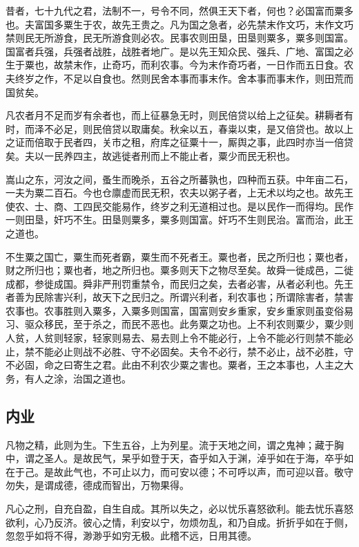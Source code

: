 \documentclass[]{article}
\begin{document}
昔者，七十九代之君，法制不一，号令不同，然俱王天下者，何也？必国富而粟多也。夫富国多粟生于农，故先王贵之。凡为国之急者，必先禁末作文巧，末作文巧禁则民无所游食，民无所游食则必农。民事农则田垦，田垦则粟多，粟多则国富。国富者兵强，兵强者战胜，战胜者地广。是以先王知众民、强兵、广地、富国之必生于粟也，故禁末作，止奇巧，而利农事。今为末作奇巧者，一日作而五日食。农夫终岁之作，不足以自食也。然则民舍本事而事末作。舍本事而事末作，则田荒而国贫矣。

凡农者月不足而岁有余者也，而上征暴急无时，则民倍贷以给上之征矣。耕耨者有时，而泽不必足，则民倍贷以取庸矣。秋籴以五，春粜以束，是又倍贷也。故以上之证而倍取于民者四，关市之租，府库之征粟十一，厮舆之事，此四时亦当一倍贷矣。夫以一民养四主，故逃徙者刑而上不能止者，粟少而民无积也。

嵩山之东，河汝之间，蚤生而晚杀，五谷之所蕃孰也，四种而五获。中年亩二石，一夫为粟二百石。今也仓廪虚而民无积，农夫以粥子者，上无术以均之也。故先王使农、士、商、工四民交能易作，终岁之利无道相过也。是以民作一而得均。民作一则田垦，奸巧不生。田垦则粟多，粟多则国富。奸巧不生则民治。富而治，此王之道也。

不生粟之国亡，粟生而死者霸，粟生而不死者王。粟也者，民之所归也；粟也者，财之所归也；粟也者，地之所归也。粟多则天下之物尽至矣。故舜一徙成邑，二徙成都，参徙成国。舜非严刑罚重禁令，而民归之矣，去者必害，从者必利也。先王者善为民除害兴利，故天下之民归之。所谓兴利者，利农事也；所谓除害者，禁害农事也。农事胜则入粟多，入粟多则国富，国富则安乡重家，安乡重家则虽变俗易习、驱众移民，至于杀之，而民不恶也。此务粟之功也。上不利农则粟少，粟少则人贫，人贫则轻家，轻家则易去、易去则上令不能必行，上令不能必行则禁不能必止，禁不能必止则战不必胜、守不必固矣。夫令不必行，禁不必止，战不必胜，守不必固，命之曰寄生之君。此由不利农少粟之害也。粟者，王之本事也，人主之大务，有人之涂，治国之道也。

\hypertarget{header-n627}{%
\subsection{内业}\label{header-n627}}

凡物之精，此则为生。下生五谷，上为列星。流于天地之间，谓之鬼神；藏于胸中，谓之圣人。是故民气，杲乎如登于天，杳乎如入于渊，淖乎如在于海，卒乎如在于己。是故此气也，不可止以力，而可安以德；不可呼以声，而可迎以音。敬守勿失，是谓成德，德成而智出，万物果得。

凡心之刑，自充自盈，自生自成。其所以失之，必以忧乐喜怒欲利。能去忧乐喜怒欲利，心乃反济。彼心之情，利安以宁，勿烦勿乱，和乃自成。折折乎如在于侧，忽忽乎如将不得，渺渺乎如穷无极。此稽不远，日用其德。
\end{document}
